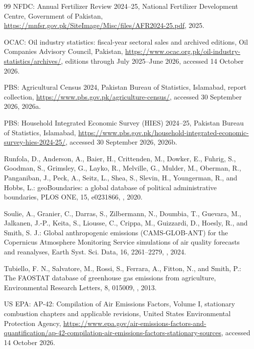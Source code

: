 \documentclass[essd,manuscript]{copernicus}
\begin{document}
\begin{thebibliography}{99}
NFDC: Annual Fertilizer Review 2024--25, National Fertilizer Development Centre, Government of Pakistan, \url{https://mnfsr.gov.pk/SiteImage/Misc/files/AFR2024-25.pdf}, 2025.

OCAC: Oil industry statistics: fiscal-year sectoral sales and archived editions, Oil Companies Advisory Council, Pakistan, \url{https://www.ocac.org.pk/oil-industry-statistics/archives/}, editions through July 2025--June 2026, accessed 14 October 2026.

PBS: Agricultural Census 2024, Pakistan Bureau of Statistics, Islamabad, report collection, \url{https://www.pbs.gov.pk/agriculture-census/}, accessed 30 September 2026, 2026a.

PBS: Household Integrated Economic Survey (HIES) 2024--25, Pakistan Bureau of Statistics, Islamabad, \url{https://www.pbs.gov.pk/household-integrated-economic-survey-hies-2024-25/}, accessed 30 September 2026, 2026b.

Runfola, D., Anderson, A., Baier, H., Crittenden, M., Dowker, E., Fuhrig, S., Goodman, S., Grimsley, G., Layko, R., Melville, G., Mulder, M., Oberman, R., Panganiban, J., Peck, A., Seitz, L., Shea, S., Slevin, H., Youngerman, R., and Hobbs, L.: geoBoundaries: a global database of political administrative boundaries, PLOS ONE, 15, e0231866, , 2020.

Soulie, A., Granier, C., Darras, S., Zilbermann, N., Doumbia, T., Guevara, M., Jalkanen, J.-P., Keita, S., Liousse, C., Crippa, M., Guizzardi, D., Hoesly, R., and Smith, S. J.: Global anthropogenic emissions (CAMS-GLOB-ANT) for the Copernicus Atmosphere Monitoring Service simulations of air quality forecasts and reanalyses, Earth Syst. Sci. Data, 16, 2261--2279, , 2024.

Tubiello, F. N., Salvatore, M., Rossi, S., Ferrara, A., Fitton, N., and Smith, P.: The FAOSTAT database of greenhouse gas emissions from agriculture, Environmental Research Letters, 8, 015009, , 2013.

US EPA: AP-42: Compilation of Air Emissions Factors, Volume I, stationary combustion chapters and applicable revisions, United States Environmental Protection Agency, \url{https://www.epa.gov/air-emissions-factors-and-quantification/ap-42-compilation-air-emissions-factors-stationary-sources}, accessed 14 October 2026.

\end{thebibliography}
\end{document}
